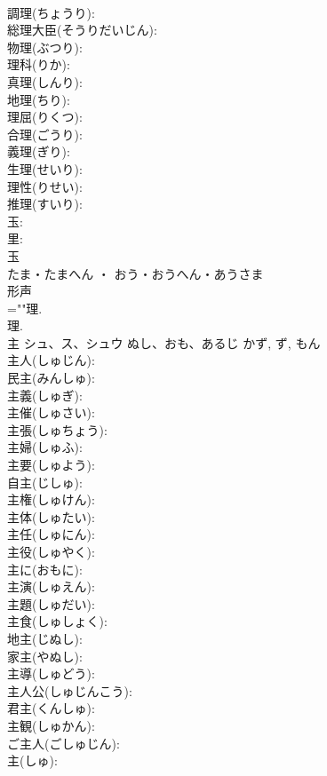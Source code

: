 \documentclass[8pt]{extreport}
\begin{document}
\begin{CJK}{UTF8}{min}
\\	調理(ちょうり): 
\\	総理大臣(そうりだいじん): 
\\	物理(ぶつり): 
\\	理科(りか): 
\\	真理(しんり): 
\\	地理(ちり): 
\\	理屈(りくつ): 
\\	合理(ごうり): 
\\	義理(ぎり): 
\\	生理(せいり): 
\\	理性(りせい): 
\\	推理(すいり): 
\\	玉: 
\\	里: 
\\	玉	
\\	たま・たまへん ・ おう・おうへん・あうさま	
\\	形声 
\\	=""理.
\\	理.
\\	主	シュ、ス、シュウ	ぬし、おも、あるじ	かず, ず, もん	
\\	主人(しゅじん): 
\\	民主(みんしゅ): 
\\	主義(しゅぎ): 
\\	主催(しゅさい): 
\\	主張(しゅちょう): 
\\	主婦(しゅふ): 
\\	主要(しゅよう): 
\\	自主(じしゅ): 
\\	主権(しゅけん): 
\\	主体(しゅたい): 
\\	主任(しゅにん): 
\\	主役(しゅやく): 
\\	主に(おもに): 
\\	主演(しゅえん): 
\\	主題(しゅだい): 
\\	主食(しゅしょく): 
\\	地主(じぬし): 
\\	家主(やぬし): 
\\	主導(しゅどう): 
\\	主人公(しゅじんこう): 
\\	君主(くんしゅ): 
\\	主観(しゅかん): 
\\	ご主人(ごしゅじん): 
\\	主(しゅ): 

\end{CJK}
\end{document}
